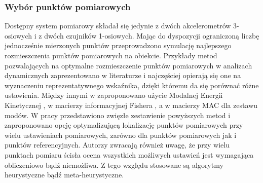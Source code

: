 \subsubsection{Wybór punktów pomiarowych} \label{sect:choose_measuremanet_locations}
Dostępny system pomiarowy składał się jedynie z dwóch akcelerometrów 3-osiowych i z dwóch czujników 1-osiowych.  Mając do dyspozycji ograniczoną liczbę jednocześnie mierzonych punktów przeprowadzono symulację najlepszego rozmieszczenia punktów pomiarowych na obiekcie. Przykłady metod pozwalających na optymalne rozmieszczenie punktów pomiarowych w analizach dynamicznych zaprezentowano w literaturze i najczęściej opierają się one na wyznaczeniu reprezentatywnego wskaźnika, dzięki któremu da się porównać różne ustawienia. Między innymi w \cite{Kammer1991,Papadopoulos1998} zaproponowano użycie Modalnej Energii Kinetycznej , w \cite{Udwadia1994} macierzy informacyjnej Fishera , a w \cite{Penny1994,Allemang2003} macierzy MAC dla zestawu modów. W pracy \cite{Zhang2017} przedstawiono zwięzłe zestawienie powyższych metod i zaproponowano opcję optymalizującą lokalizację punktów pomiarowych przy wielu ustawieniach pomiarowych, zarówno dla punktów pomiarowych jak i punktów referencyjnych. Autorzy zwracają również uwagę, że przy wielu punktach pomiaru ścisła ocena wszystkich możliwych ustawień jest wymagająca obliczeniowo bądź niemożliwa. Z tego względu stosowane są algorytmy heurystyczne bądź meta-heurystyczne. 

